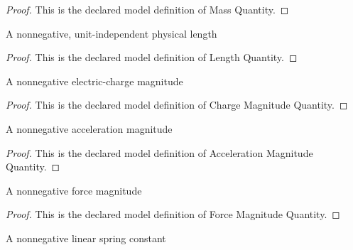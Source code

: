 \begin{proof}
  This is the declared model definition of Mass Quantity.
\end{proof}
\begin{definition}
  \label{def:physics:phyx-mini-0891:phyxminiproblems-problemphyxmini0891-lengthquantity}
  A nonnegative, unit-independent physical length
\end{definition}
\begin{proof}
  This is the declared model definition of Length Quantity.
\end{proof}
\begin{definition}
  \label{def:physics:phyx-mini-0891:phyxminiproblems-problemphyxmini0891-chargemagnitudequantity}
  A nonnegative electric-charge magnitude
\end{definition}
\begin{proof}
  This is the declared model definition of Charge Magnitude Quantity.
\end{proof}
\begin{definition}
  \label{def:physics:phyx-mini-0891:phyxminiproblems-problemphyxmini0891-accelerationmagnitudequantity}
  A nonnegative acceleration magnitude
\end{definition}
\begin{proof}
  This is the declared model definition of Acceleration Magnitude Quantity.
\end{proof}
\begin{definition}
  \label{def:physics:phyx-mini-0891:phyxminiproblems-problemphyxmini0891-forcemagnitudequantity}
  A nonnegative force magnitude
\end{definition}
\begin{proof}
  This is the declared model definition of Force Magnitude Quantity.
\end{proof}
\begin{definition}
  \label{def:physics:phyx-mini-0891:phyxminiproblems-problemphyxmini0891-springconstantquantity}
  A nonnegative linear spring constant
\end{definition}

